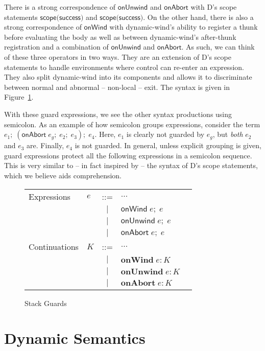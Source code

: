 \documentclass[11pt]{article}
\newcommand{\onWind}[2]{\textsf{onWind}\;#1;\;#2}
\newcommand{\onUnwind}[2]{\textsf{onUnwind}\;#1;\;#2}
\newcommand{\onAbort}[2]{\textsf{onAbort}\;#1;\;#2}
\begin{document}
There is a strong correspondence of $\textsf{onUnwind}$ and $\textsf{onAbort}$ with D's scope statements $\textsf{scope(success)}$ and $\textsf{scope(success)}$.
On the other hand, there is also a strong correspondence of $\textsf{onWind}$ with dynamic-wind's ability to register a thunk before evaluating the body as well as between dynamic-wind's after-thunk registration and a combination of $\textsf{onUnwind}$ and $\textsf{onAbort}$.
As such, we can think of these three operators in two ways.
They are an extension of D's scope statements to handle environments where control can re-enter an expression.
They also split dynamic-wind into its components and allows it to discriminate between normal and abnormal -- non-local -- exit.
The syntax is given in Figure~\ref{fig:addGuards}.

With these guard expressions, we see the other syntax productions using semicolon.
As an example of how semicolon groups expressions, consider the term $e_1;\;(\textsf{onAbort}\;e_g;\;e_2;\;e_3);\;e_4$.
Here, $e_1$ is clearly not guarded by $e_g$, but \emph{both} $e_2$ and $e_3$ are.
Finally, $e_4$ is not guarded.
In general, unless explicit grouping is given, guard expressions protect all the following expressions in a semicolon sequence.
This is very similar to -- in fact inspired by -- the syntax of D's scope statements, which we believe aids comprehension.

\begin{figure}[h!]
\caption{Stack Guards}
\label{fig:addGuards}

\begin{tabular}{llcll}
Expressions & $e$ & ::= & $\ldots$ \\
& & $|$ & $\onWind{e}{e}$ \\
& & $|$ & $\onUnwind{e}{e}$ \\
& & $|$ & $\onAbort{e}{e}$ \\
Continuations & $K$ & ::= & $\ldots$ \\
& & $|$ & $\textbf{onWind}\;e:K$ \\
& & $|$ & $\textbf{onUnwind}\;e:K$ \\
& & $|$ & $\textbf{onAbort}\;e:K$ \\
\end{tabular}
\end{figure}





\section{Dynamic Semantics}
\label{sec:evaluation}
\end{document}
